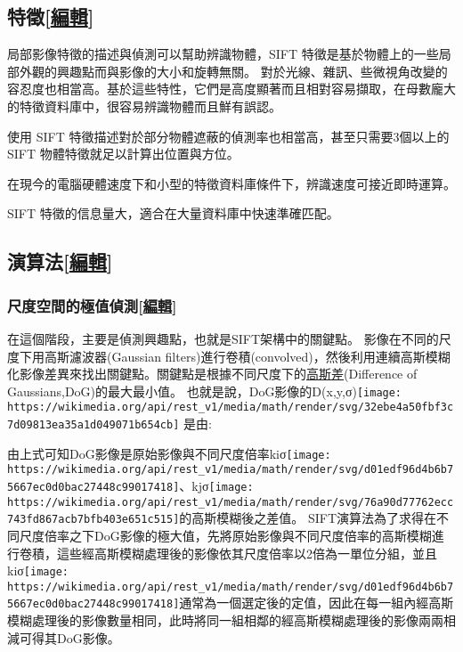 \documentclass[
]{article}
\begin{document}
\hypertarget{header-n22}{%
\subsection{\texorpdfstring{特徵{[}\href{https://zh.wikipedia.org/w/index.php?title=尺度不變特徵轉換\&action=edit\&section=1}{編輯}{]}}{特徵{[}編輯{]}}}\label{header-n22}}

局部影像特徵的描述與偵測可以幫助辨識物體，SIFT
特徵是基於物體上的一些局部外觀的興趣點而與影像的大小和旋轉無關。
對於光線、雜訊、些微視角改變的容忍度也相當高。基於這些特性，它們是高度顯著而且相對容易擷取，在母數龐大的特徵資料庫中，很容易辨識物體而且鮮有誤認。

使用 SIFT 特徵描述對於部分物體遮蔽的偵測率也相當高，甚至只需要3個以上的
SIFT 物體特徵就足以計算出位置與方位。

在現今的電腦硬體速度下和小型的特徵資料庫條件下，辨識速度可接近即時運算。

SIFT 特徵的信息量大，適合在大量資料庫中快速準確匹配。

\hypertarget{header-n27}{%
\subsection{\texorpdfstring{演算法{[}\href{https://zh.wikipedia.org/w/index.php?title=尺度不變特徵轉換\&action=edit\&section=2}{編輯}{]}}{演算法{[}編輯{]}}}\label{header-n27}}

\hypertarget{header-n28}{%
\subsubsection{\texorpdfstring{尺度空間的極值偵測{[}\href{https://zh.wikipedia.org/w/index.php?title=尺度不變特徵轉換\&action=edit\&section=3}{編輯}{]}}{尺度空間的極值偵測{[}編輯{]}}}\label{header-n28}}

在這個階段，主要是偵測興趣點，也就是SIFT架構中的關鍵點。
影像在不同的尺度下用高斯濾波器(Gaussian
filters)進行卷積(convolved)，然後利用連續高斯模糊化影像差異來找出關鍵點。關鍵點是根據不同尺度下的\href{https://zh.wikipedia.org/wiki/高斯差}{高斯差}(Difference
of Gaussians,DoG)的最大最小值。
也就是說，DoG影像的D(x,y,σ)\texttt{[image: https://wikimedia.org/api/rest\_v1/media/math/render/svg/32ebe4a50fbf3c7d09813ea35a1d049071b654cb]}
是由:

由上式可知DoG影像是原始影像與不同尺度倍率kiσ\texttt{[image: https://wikimedia.org/api/rest\_v1/media/math/render/svg/d01edf96d4b6b75667ec0d0bac27448c99017418]}、kjσ\texttt{[image: https://wikimedia.org/api/rest\_v1/media/math/render/svg/76a90d77762ecc743fd867acb7bfb403e651c515]}的高斯模糊後之差值。
SIFT演算法為了求得在不同尺度倍率之下DoG影像的極大值，先將原始影像與不同尺度倍率的高斯模糊進行卷積，這些經高斯模糊處理後的影像依其尺度倍率以2倍為一單位分組，並且kiσ\texttt{[image: https://wikimedia.org/api/rest\_v1/media/math/render/svg/d01edf96d4b6b75667ec0d0bac27448c99017418]}通常為一個選定後的定值，因此在每一組內經高斯模糊處理後的影像數量相同，此時將同一組相鄰的經高斯模糊處理後的影像兩兩相減可得其DoG影像。
\end{document}
